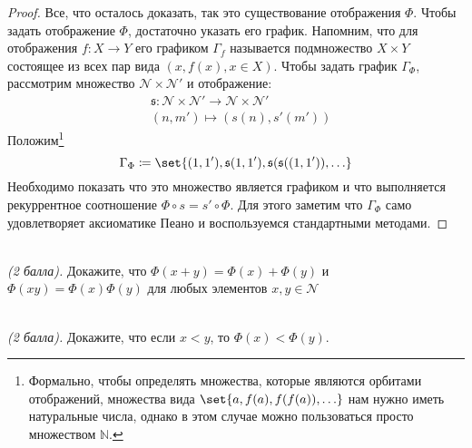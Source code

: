 \documentclass{article}
\begin{document}
\begin{proof}
    Все, что осталось доказать, так это существование отображения \(\Phi\). Чтобы задать отображение \(\Phi\), достаточно указать его график. Напомним, что для отображения \(f \colon X \to Y\) его графиком \(\Gamma_f\) называется подмножество \(X \times Y\) состоящее из всех пар вида \((x, f(x), x \in X)\). Чтобы задать график \(\Gamma_{\Phi}\), рассмотрим множество \(\mathcal{N} \times \mathcal{N}'\) и отображение:
    \begin{align*}
        & \mathfrak{s} \colon \mathcal{N} \times \mathcal{N}' \to \mathcal{N} \times \mathcal{N}' \\
        & (n, m') \mapsto (s(n), s'(m'))
    \end{align*}
    Положим\footnote{Формально, чтобы определять множества, которые являются орбитами отображений, \ie множества вида \(\set{a, f(a), f(f(a)), \ldots}\) нам нужно иметь натуральные числа, однако в этом случае можно пользоваться просто множеством \(\mathbb{N}\).}
    \[
        \Gamma_{\Phi} \coloneqq \set{(1, 1'), \mathfrak{s}(1, 1'), \mathfrak{s}(\mathfrak{s}((1, 1')), \ldots}
    \]
    Необходимо показать что это множество является графиком и что выполняется рекуррентное соотношение \(\Phi \circ s = s' \circ \Phi\). Для этого заметим что \(\Gamma_{\Phi}\) само удовлетворяет аксиоматике Пеано и воспользуемся стандартными методами.
\end{proof}
\begin{?}\ \\
    \textit{(2 балла).} Докажите, что \(\Phi(x + y) = \Phi(x) + \Phi(y)\) и \(\Phi(xy) = \Phi(x) \Phi(y)\) для любых элементов \(x, y \in \mathcal{N}\)
\end{?}
\begin{?}\ \\
    \textit{(2 балла).} Докажите, что если \(x < y\), то \(\Phi(x) < \Phi(y)\).
\end{?}
\end{document}
